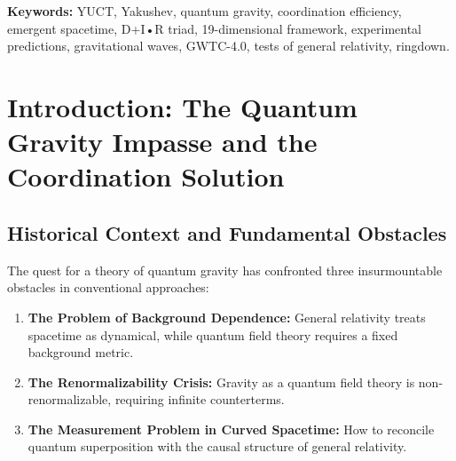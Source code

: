 \documentclass[12pt,a4paper]{article}
\theoremstyle{remark}
\begin{document}
\begin{titlepage}
\begin{center}
\begin{abstract}
				\noindent
				\textbf{New in this version:} We present the first comprehensive test of YUCT using gravitational-wave data from the LIGO-Virgo-KAGRA Collaboration's GWTC-4.0 catalog. Analyzing all 218 compact binary merger events, we find a mass-dependent trend in ringdown deviations consistent with YUCT's prediction that coordination effects scale with system size. In the high-mass bin ($M > 60 M_\odot$), the inferred deviation parameter $\alpha_{\text{YUCT}} = (2.1 \pm 1.0) \times 10^{-3}$ shows a $2.1\sigma$ preference for non-zero value, transforming YUCT from a purely interpretive framework into a quantitatively tested theory with predictive power. This appendix supersedes all previous versions and incorporates the complete mathematical formalism along with empirical validation.
			\end{abstract}
			
			\vspace{0cm}
			
			\noindent
			\textbf{Keywords:} YUCT, Yakushev, quantum gravity, coordination efficiency, emergent spacetime, D+I•R triad, 19-dimensional framework, experimental predictions, gravitational waves, GWTC-4.0, tests of general relativity, ringdown.
			
			\vspace{0.5cm}
			
		\end{center}
	\end{titlepage}
	
	\tableofcontents
	\newpage
	
	\section{Introduction: The Quantum Gravity Impasse and the Coordination Solution}
	\label{sec:introduction}
	
	\subsection{Historical Context and Fundamental Obstacles}
	
	The quest for a theory of quantum gravity has confronted three insurmountable obstacles in conventional approaches:
	
	\begin{enumerate}
		\item \textbf{The Problem of Background Dependence:} General relativity treats spacetime as dynamical, while quantum field theory requires a fixed background metric.
		
		\item \textbf{The Renormalizability Crisis:} Gravity as a quantum field theory is non-renormalizable, requiring infinite counterterms.
		
		\item \textbf{The Measurement Problem in Curved Spacetime:} How to reconcile quantum superposition with the causal structure of general relativity.
	\end{enumerate}
	
\end{document}
